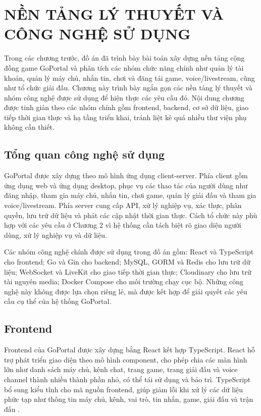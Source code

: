 \chapter{NỀN TẢNG LÝ THUYẾT VÀ CÔNG NGHỆ SỬ DỤNG}
\label{chapter:3}

Trong các chương trước, đồ án đã trình bày bài toán xây dựng nền tảng cộng đồng game GoPortal và phân tích các nhóm chức năng chính như quản lý tài khoản, quản lý máy chủ, nhắn tin, chơi và đăng tải game, voice/livestream, cũng như tổ chức giải đấu. Chương này trình bày ngắn gọn các nền tảng lý thuyết và nhóm công nghệ được sử dụng để hiện thực các yêu cầu đó. Nội dung chương được tinh giản theo các nhóm chính gồm frontend, backend, cơ sở dữ liệu, giao tiếp thời gian thực và hạ tầng triển khai, tránh liệt kê quá nhiều thư viện phụ không cần thiết.

\section{Tổng quan công nghệ sử dụng}
\label{section:3.1}

GoPortal được xây dựng theo mô hình ứng dụng client-server. Phía client gồm ứng dụng web và ứng dụng desktop, phục vụ các thao tác của người dùng như đăng nhập, tham gia máy chủ, nhắn tin, chơi game, quản lý giải đấu và tham gia voice/livestream. Phía server cung cấp API, xử lý nghiệp vụ, xác thực, phân quyền, lưu trữ dữ liệu và phát các cập nhật thời gian thực. Cách tổ chức này phù hợp với các yêu cầu ở Chương 2 vì hệ thống cần tách biệt rõ giao diện người dùng, xử lý nghiệp vụ và dữ liệu.

Các nhóm công nghệ chính được sử dụng trong đồ án gồm: React và TypeScript cho frontend; Go và Gin cho backend; MySQL, GORM và Redis cho lưu trữ dữ liệu; WebSocket và LiveKit cho giao tiếp thời gian thực; Cloudinary cho lưu trữ tài nguyên media; Docker Compose cho môi trường chạy cục bộ. Những công nghệ này không được lựa chọn riêng lẻ, mà được kết hợp để giải quyết các yêu cầu cụ thể của hệ thống GoPortal.

\section{Frontend}
\label{section:3.2}

Frontend của GoPortal được xây dựng bằng React kết hợp TypeScript. React hỗ trợ phát triển giao diện theo mô hình component, cho phép chia các màn hình lớn như danh sách máy chủ, kênh chat, trang game, trang giải đấu và voice channel thành nhiều thành phần nhỏ, có thể tái sử dụng và bảo trì. TypeScript bổ sung kiểu tĩnh cho mã nguồn frontend, giúp giảm lỗi khi xử lý các dữ liệu phức tạp như thông tin máy chủ, kênh, vai trò, tin nhắn, game, giải đấu và trận đấu \cite{react-docs,typescript-docs}.

